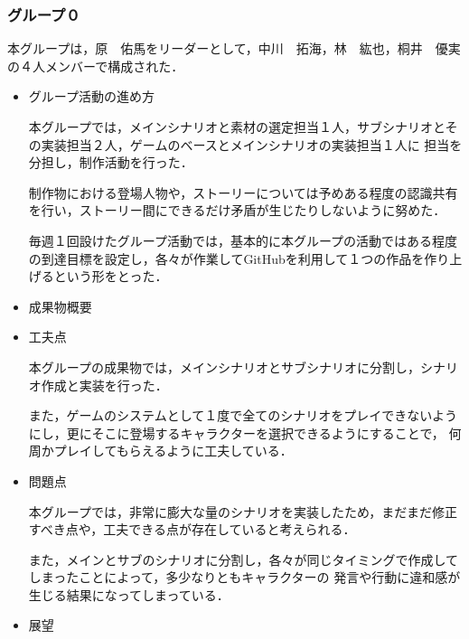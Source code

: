 \subsubsection{グループ０}
    
    本グループは，原　佑馬をリーダーとして，中川　拓海，林　紘也，桐井　優実の４人メンバーで構成された．

    \begin{itemize}
        \item グループ活動の進め方
        

        本グループでは，メインシナリオと素材の選定担当１人，サブシナリオとその実装担当２人，ゲームのベースとメインシナリオの実装担当１人に
        担当を分担し，制作活動を行った．

        制作物における登場人物や，ストーリーについては予めある程度の認識共有を行い，ストーリー間にできるだけ矛盾が生じたりしないように努めた．

        毎週１回設けたグループ活動では，基本的に本グループの活動ではある程度の到達目標を設定し，各々が作業してGitHubを利用して１つの作品を作り上げるという形をとった．

        \item 成果物概要
        


        \item 工夫点
        

        本グループの成果物では，メインシナリオとサブシナリオに分割し，シナリオ作成と実装を行った．

        また，ゲームのシステムとして１度で全てのシナリオをプレイできないようにし，更にそこに登場するキャラクターを選択できるようにすることで，
        何周かプレイしてもらえるように工夫している．

        \item 問題点
        

        本グループでは，非常に膨大な量のシナリオを実装したため，まだまだ修正すべき点や，工夫できる点が存在していると考えられる．

        また，メインとサブのシナリオに分割し，各々が同じタイミングで作成してしまったことによって，多少なりともキャラクターの
        発言や行動に違和感が生じる結果になってしまっている．

        \item 展望
        


    \end{itemize}

